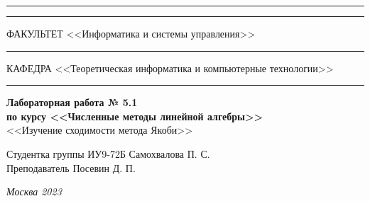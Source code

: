 \documentclass[a4paper, 14pt]{extarticle}
\begin{document}
\begin{titlepage}
\vspace{-25pt}
\hspace{-35pt}\rule{\textwidth}{2.3pt}

\vspace*{-20.3pt}
\hspace{-35pt}\rule{\textwidth}{0.4pt}

\vspace{1.5ex}
\hspace{-35pt} \noindent \small ФАКУЛЬТЕТ\hspace{80pt} <<Информатика и системы управления>>

\vspace*{-16pt}
\hspace{47pt}\rule{0.83\textwidth}{0.4pt}

\vspace{0.5ex}
\hspace{-35pt} \noindent \small КАФЕДРА\hspace{50pt} <<Теоретическая информатика и компьютерные технологии>>

\vspace*{-16pt}
\hspace{30pt}\rule{0.866\textwidth}{0.4pt}
  
\vspace{11em}

\begin{center}
\Large {\bf Лабораторная работа № 5.1} \\
\large {\bf по курсу <<Численные методы линейной алгебры>>} \\
\large <<Изучение сходимости метода Якоби>>
\end{center}\normalsize

\vspace{8em}


\begin{flushright}
  {Студентка группы ИУ9-72Б Самохвалова П. С. \hspace*{15pt}\\
  \vspace{2ex}
  Преподаватель Посевин Д. П.\hspace*{15pt}}
\end{flushright}

\bigskip

\vfill
 

\begin{center}
\textsl{Москва 2023}
\end{center}
\end{titlepage}
\end{document}
